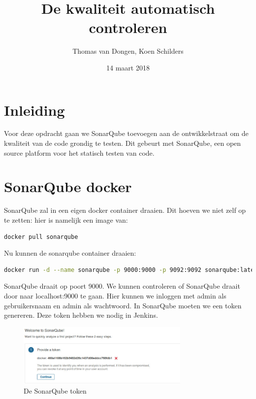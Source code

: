 \documentclass[12pt]{article}
\title{De kwaliteit automatisch controleren}
\author{Thomas van Dongen, Koen Schilders}
\date{14 maart 2018}
\begin{document}
\begin{titlepage}
\maketitle
\end{titlepage}

\section{Inleiding}
Voor deze opdracht gaan we SonarQube toevoegen aan de ontwikkelstraat om de kwaliteit van de code grondig te testen. Dit gebeurt met SonarQube, een open source platform voor het statisch testen van code.

\section{SonarQube docker}
SonarQube zal in een eigen docker container draaien. Dit hoeven we niet zelf op te zetten: hier is namelijk een image van:
\begin{lstlisting}[language=Bash]
docker pull sonarqube
\end{lstlisting}

Nu kunnen de sonarqube container draaien:
\begin{lstlisting}[language=Bash]
docker run -d --name sonarqube -p 9000:9000 -p 9092:9092 sonarqube:latest
\end{lstlisting}

SonarQube draait op poort 9000. We kunnen controleren of SonarQube draait door naar localhost:9000 te gaan. Hier kunnen we inloggen met admin als gebruikersnaam en admin als wachtwoord. In SonarQube moeten we een token genereren. Deze token hebben we nodig in Jenkins.

\begin{figure}[H]
	\begin{center}
		\includegraphics[width=0.75\textwidth]{images/sonarqube_token.PNG}
		\caption{De SonarQube token\label{fig:sonarqube_token}}
	\end{center}
\end{figure}
\end{document}
